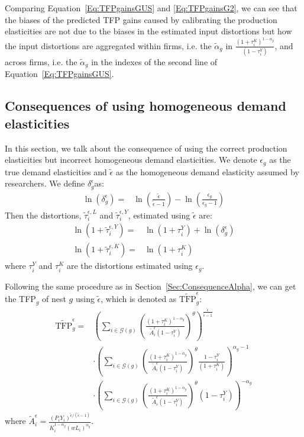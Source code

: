 \documentclass[12pt]{article}
\begin{document}
Comparing Equation~\eqref{Eq:TFPgainsGUS} and \eqref{Eq:TFPgainsG2}, we can see that the biases of the predicted TFP gains caused by calibrating the production elasticities are not due to the biases in the estimated input distortions but how the input distortions are aggregated within firms, i.e. the $\tilde{\alpha}_g$ in $\frac{(1+\tau_i^K)^{1-\alpha_g}}{(1-\tau_i^Y)}$, and across firms, i.e. the $\tilde{\alpha}_g$ in the indexes of the second line of Equation~\eqref{Eq:TFPgainsGUS}.

\subsection{Consequences of using homogeneous demand elasticities}
In this section, we talk about the consequence of using the correct production elasticities but incorrect homogeneous demand elasticities. We denote $\epsilon_g$ as the true demand elasticities and $\tilde{\epsilon}$ as the homogeneous demand elasticity assumed by researchers. We define $\delta_g^{\epsilon}$as:
\begin{align*}
\ln(\delta_g^{\epsilon})=&\ln\left( \frac{\tilde{\epsilon}}{\tilde{\epsilon}-1} \right)-\ln\left( \frac{\epsilon_g}{\epsilon_g-1} \right)
\end{align*}
Then the distortions, $\tilde{\tau}_i^{\epsilon,L}$ and $\tilde{\tau}_i^{\epsilon,Y}$, estimated using $\tilde{\epsilon}$ are:
\begin{align*}
\ln(1+\tilde{\tau}_i^{\epsilon,Y})=&\ln(1+\tau_i^Y)+\ln(\delta_g^{\epsilon})\\
\ln(1+\tilde{\tau}_i^{\epsilon,K})=&\ln(1+\tau_i^K)
\end{align*}
where $\tau_i^Y$ and $\tau_i^K$ are the distortions estimated using $\epsilon_g$.

Following the same procedure as in Section~\ref{Sec:ConsequenceAlpha}, we can get the TFP$_g$ of nest $g$ using $\tilde{\epsilon}$, which is denoted as $\widetilde{\text{TFP}}_g^{\epsilon}$:
\begin{align*}
\widetilde{\text{TFP}}_g^{\epsilon}=&\left( \sum_{i\in\mathcal{G}(g)}\left( \frac{(1+\tau_i^K)^{1-\alpha_g}}{\tilde{A}^{\epsilon}_i(1-\tau_i^Y)} \right)^{\theta} \right)^{\frac{\tilde{\epsilon}}{\tilde{\epsilon}-1}} \\
& \cdot \left( \sum_{i\in\mathcal{G}(g)}\left( \frac{(1+\tau_i^K)^{1-\alpha_g}}{\tilde{A}^{\epsilon}_i(1-\tau_i^Y)} \right)^{\theta} \frac{1-\tau_i^Y}{(1+\tau_i^K)}\right)^{\alpha_g-1}\\
& \cdot \left( \sum_{i\in\mathcal{G}(g)}\left( \frac{(1+\tau_i^K)^{1-\alpha_g}}{\tilde{A}^{\epsilon}_i(1-\tau_i^Y)} \right)^{\theta} (1-\tau_i^Y)\right)^{-\alpha_g} 
\end{align*}
where $\tilde{A}^{\epsilon}_i=\frac{( P_{i}Y_{i} )^{\tilde{\epsilon}/(\tilde{\epsilon}-1)}}{K_{i}^{1-\alpha_g}(wL_{i})^{\alpha_g}}$.
\end{document}
